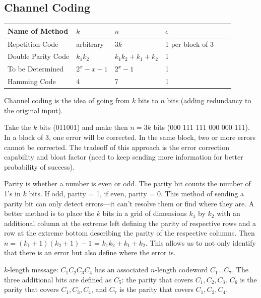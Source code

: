 \documentclass[11pt]{article}
\theoremstyle{definition}
\begin{document}
\subsection{Channel Coding}

\begin{table}[ht]
\centering
\label{my-label}
\begin{tabular}{@{}lll@{}lll@{}}
\toprule
Name of Method &$k$       & $n$                  & $e$              \\ \midrule
Repetition Code &arbitrary & $3k$                 & 1 per block of 3 \\
Double Parity Code&$k_1k_2$  & $k_1k_2 + k_1 + k_2$\: & 1                \\
To be Determined &$2^x - x - 1$ & $2^x - 1$ & 1 \\ 
Hamming Code & 4         &              7        &            1      \\ \bottomrule
\end{tabular}
\end{table}

\noindent Channel coding is the idea of going from $k$ bits to $n$ bits (adding redundancy to the original input). 

 Take the $k$ bits (011001) and make then $n = 3k$ bits (000 111 111 000 000 111). In a block of 3, one error will be corrected. In the same block, two or more errors cannot be corrected. The tradeoff of this approach is the error correction capability and bloat factor (need to keep sending more information for better probability of success).

 Parity is whether a number is even or odd. The parity bit counts the number of 1's in $k$ bits. If odd, parity = 1, if even, parity = 0. This method of sending a parity bit can only detect errors---it can't resolve them or find where they are. A better method is to place the $k$ bits in a grid of dimensions $k_1$ by $k_2$ with an additional column at the extreme left defining the parity of respective rows and a row at the extreme bottom describing the parity of the respective columns. Then $n = (k_1 + 1)(k_2 + 1) -1$ = $k_1k_2 + k_1 + k_2$. This allows us to not only identify that there is an error but also define where the error is. 

 $k$-length message: $C_1C_2C_3C_4$ has an associated $n$-length codeword $C_1 \dots C_7$. The three additional bits are defined as $C_5$: the parity that covers $C_1, C_2, C_3$. $C_6$ is the parity that covers $C_1, C_3, C_4$, and $C_7$ is the parity that covers $C_1, C_2, C_4$. 
\end{document}
